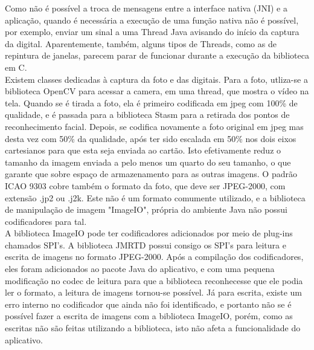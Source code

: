 \documentclass{article}
\begin{document}
\begin{justify}
		\hspace*{2cm}Como não é possível a troca de mensagens entre a interface nativa (JNI) e a aplicação, quando é necessária a execução de uma função nativa não é possível, por exemplo, enviar um sinal a uma Thread Java avisando do início da captura da digital. Aparentemente, também, alguns tipos de Threads, como as de repintura de janelas, parecem parar de funcionar durante a execução da biblioteca em C.\\
		\hspace*{2cm}Existem classes dedicadas à captura da foto e das digitais. Para a foto, utliza-se a biblioteca OpenCV para acessar a camera, em uma thread, que mostra o vídeo na tela. Quando se é tirada a foto, ela é primeiro codificada em jpeg com 100\% de qualidade, e é passada para a biblioteca Stasm para a retirada dos pontos de reconhecimento facial. Depois, se codifica novamente a foto original em jpeg mas desta vez com 50\% da qualidade, após ter sido escalada em 50\% nos dois eixos cartesianos para que esta seja enviada ao cartão. Isto efetivamente reduz o tamanho da imagem enviada a pelo menos um quarto do seu tamanho, o que garante que sobre espaço de armazenamento para as outras imagens. O padrão ICAO 9303 cobre também o formato da foto, que deve ser JPEG-2000, com extensão .jp2 ou .j2k. Este não é um formato comumente utilizado, e a biblioteca de manipulação de imagem "ImageIO", própria do ambiente Java não possui codificadores para tal.\\
		\hspace*{2cm} A biblioteca ImageIO pode ter codificadores adicionados por meio de plug-ins chamados SPI's. A biblioteca JMRTD possui consigo os SPI's para leitura e escrita de imagens no formato JPEG-2000. Após a compilação dos codificadores, eles foram adicionados ao pacote Java do aplicativo, e com uma pequena modificação no codec de leitura para que a biblioteca reconhecesse que ele podia ler o formato, a leitura de imagens tornou-se possível. Já para escrita, existe um erro interno no codificador que ainda não foi identificado, e portanto não se é possível fazer a escrita de imagens com a biblioteca ImageIO, porém, como as escritas não são feitas utilizando a biblioteca, isto não afeta a funcionalidade do aplicativo.

\end{justify}
\end{document}
